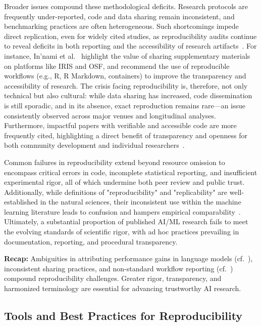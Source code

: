 \documentclass[sigconf]{acmart}
\begin{document}
Broader issues compound these methodological deficits. Research protocols are frequently under-reported, code and data sharing remain inconsistent, and benchmarking practices are often heterogeneous. Such shortcomings impede direct replication, even for widely cited studies, as reproducibility audits continue to reveal deficits in both reporting and the accessibility of research artifacts~\cite{ref107,ref108}. For instance, In'nami et al.~\cite{ref108} highlight the value of sharing supplementary materials on platforms like IRIS and OSF, and recommend the use of reproducible workflows (e.g., R, R Markdown, containers) to improve the transparency and accessibility of research. The crisis facing reproducibility is, therefore, not only technical but also cultural: while data sharing has increased, code dissemination is still sporadic, and in its absence, exact reproduction remains rare—an issue consistently observed across major venues and longitudinal analyses. Furthermore, impactful papers with verifiable and accessible code are more frequently cited, highlighting a direct benefit of transparency and openness for both community development and individual researchers~\cite{ref108}.

Common failures in reproducibility extend beyond resource omission to encompass critical errors in code, incomplete statistical reporting, and insufficient experimental rigor, all of which undermine both peer review and public trust. Additionally, while definitions of "reproducibility" and "replicability" are well-established in the natural sciences, their inconsistent use within the machine learning literature leads to confusion and hampers empirical comparability~\cite{ref108}. Ultimately, a substantial proportion of published AI/ML research fails to meet the evolving standards of scientific rigor, with ad hoc practices prevailing in documentation, reporting, and procedural transparency.

\begin{flushright}
\textbf{Recap:} Ambiguities in attributing performance gains in language models (cf.~\cite{ref107}), inconsistent sharing practices, and non-standard workflow reporting (cf.~\cite{ref108}) compound reproducibility challenges. Greater rigor, transparency, and harmonized terminology are essential for advancing trustworthy AI research.
\end{flushright}

\subsection{Tools and Best Practices for Reproducibility}
\end{document}
